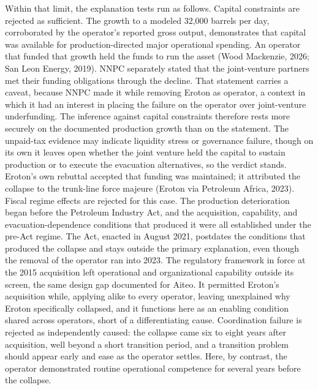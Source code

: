 Within that limit, the explanation tests run as follows. Capital
constraints are rejected as sufficient. The growth to a modeled 32,000
barrels per day, corroborated by the operator's reported gross output,
demonstrates that capital was available for production-directed major
operational spending. An operator that funded that growth held the funds
to run the asset (Wood Mackenzie, 2026; San Leon Energy, 2019). NNPC
separately stated that the joint-venture partners met their funding
obligations through the decline. That statement carries a caveat,
because NNPC made it while removing Eroton as operator, a context in
which it had an interest in placing the failure on the operator over
joint-venture underfunding. The inference against capital constraints
therefore rests more securely on the documented production growth than
on the statement. The unpaid-tax evidence may indicate liquidity stress
or governance failure, though on its own it leaves open whether the
joint venture held the capital to sustain production or to execute the
evacuation alternatives, so the verdict stands. Eroton's own rebuttal
accepted that funding was maintained; it attributed the collapse to the
trunk-line force majeure (Eroton via Petroleum Africa, 2023). Fiscal
regime effects are rejected for this case. The production deterioration
began before the Petroleum Industry Act, and the acquisition,
capability, and evacuation-dependence conditions that produced it were
all established under the pre-Act regime. The Act, enacted in August
2021, postdates the conditions that produced the collapse and stays
outside the primary explanation, even though the removal of the operator
ran into 2023. The regulatory framework in force at the 2015 acquisition
left operational and organizational capability outside its screen, the
same design gap documented for Aiteo. It permitted Eroton's acquisition
while, applying alike to every operator, leaving unexplained why Eroton
specifically collapsed, and it functions here as an enabling condition
shared across operators, short of a differentiating cause. Coordination
failure is rejected as independently caused: the collapse came six to
eight years after acquisition, well beyond a short transition period,
and a transition problem should appear early and ease as the operator
settles. Here, by contrast, the operator demonstrated routine
operational competence for several years before the collapse.

